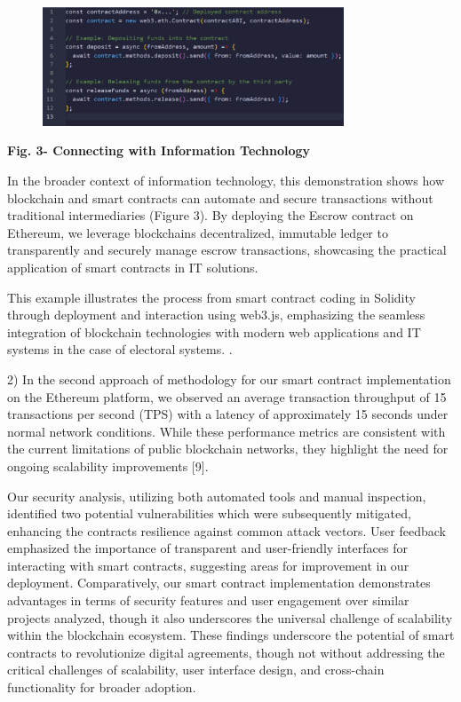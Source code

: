 \begin{figure}[H]
	\centering
	\includegraphics[width=0.8\textwidth]{assets/80}
	\caption*{}
\end{figure}

\textbf{Fig. 3- Connecting with Information Technology}

In the broader context of information technology, this demonstration
shows how blockchain and smart contracts can automate and secure
transactions without traditional intermediaries (Figure 3). By deploying
the Escrow contract on Ethereum, we leverage
blockchain\textquotesingle s decentralized, immutable ledger to
transparently and securely manage escrow transactions, showcasing the
practical application of smart contracts in IT solutions.

This example illustrates the process from smart contract coding in
Solidity through deployment and interaction using web3.js, emphasizing
the seamless integration of blockchain technologies with modern web
applications and IT systems in the case of electoral systems. .

2) In the second approach of methodology for our smart contract
implementation on the Ethereum platform, we observed an average
transaction throughput of 15 transactions per second (TPS) with a
latency of approximately 15 seconds under normal network conditions.
While these performance metrics are consistent with the current
limitations of public blockchain networks, they highlight the need for
ongoing scalability improvements {[}9{]}.

Our security analysis, utilizing both automated tools and manual
inspection, identified two potential vulnerabilities which were
subsequently mitigated, enhancing the contract\textquotesingle s
resilience against common attack vectors. User feedback emphasized the
importance of transparent and user-friendly interfaces for interacting
with smart contracts, suggesting areas for improvement in our
deployment. Comparatively, our smart contract implementation
demonstrates advantages in terms of security features and user
engagement over similar projects analyzed, though it also underscores
the universal challenge of scalability within the blockchain ecosystem.
These findings underscore the potential of smart contracts to
revolutionize digital agreements, though not without addressing the
critical challenges of scalability, user interface design, and
cross-chain functionality for broader adoption.

